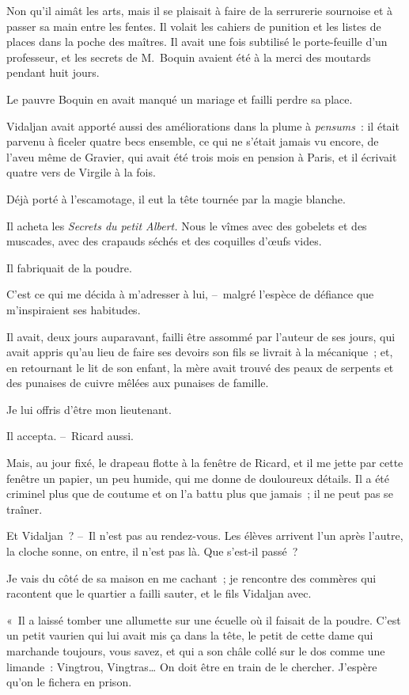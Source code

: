 \documentclass[french,twoside]{book} %
\begin{document}
Non qu’il aimât les arts, mais il se plaisait à faire de la serrurerie sournoise et à passer sa main entre les fentes. Il volait les cahiers de punition et les listes de places dans la poche des maîtres. Il avait une fois subtilisé le porte-feuille d’un professeur, et les secrets de M. Boquin avaient été à la merci des moutards pendant huit jours.\par
Le pauvre Boquin en avait manqué un mariage et failli perdre sa place.\par
Vidaljan avait apporté aussi des améliorations dans la plume à \emph{pensums} : il était parvenu à ficeler quatre becs ensemble, ce qui ne s’était jamais vu encore, de l’aveu même de Gravier, qui avait été trois mois en pension à Paris, et il écrivait quatre vers de Virgile à la fois.\par
Déjà porté à l’escamotage, il eut la tête tournée par la magie blanche.\par
Il acheta les \emph{Secrets du petit Albert.} Nous le vîmes avec des gobelets et des muscades, avec des crapauds séchés et des coquilles d’œufs vides.\par
Il fabriquait de la poudre.\par
C’est ce qui me décida à m’adresser à lui, – malgré l’espèce de défiance que m’inspiraient ses habitudes.\par
Il avait, deux jours auparavant, failli être assommé par l’auteur de ses jours, qui avait appris qu’au lieu de faire ses devoirs son fils se livrait à la mécanique ; et, en retournant le lit de son enfant, la mère avait trouvé des peaux de serpents et des punaises de cuivre mêlées aux punaises de famille.\par
Je lui offris d’être mon lieutenant.\par
Il accepta. – Ricard aussi.\par
\bigbreak
\noindent Mais, au jour fixé, le drapeau flotte à la fenêtre de Ricard, et il me jette par cette fenêtre un papier, un peu humide, qui me donne de douloureux détails. Il a été criminel plus que de coutume et on l’a battu plus que jamais ; il ne peut pas se traîner.\par
Et Vidaljan ? – Il n’est pas au rendez-vous. Les élèves arrivent l’un après l’autre, la cloche sonne, on entre, il n’est pas là. Que s’est-il passé ?\par
Je vais du côté de sa maison en me cachant ; je rencontre des commères qui racontent que le quartier a failli sauter, et le fils Vidaljan avec.\par
« Il a laissé tomber une allumette sur une écuelle où il faisait de la poudre. C’est un petit vaurien qui lui avait mis ça dans la tête, le petit de cette dame qui marchande toujours, vous savez, et qui a son châle collé sur le dos comme une limande : Vingtrou, Vingtras… On doit être en train de le chercher. J’espère qu’on le fichera en prison.\par
\end{document}
